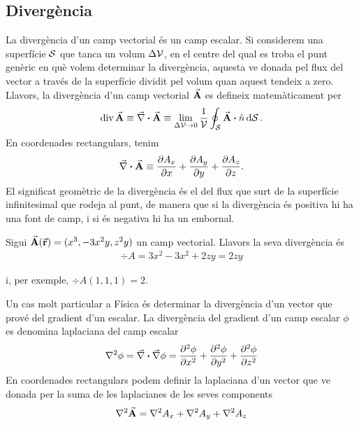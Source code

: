 \subsection{Divergència}
La divergència d'un camp vectorial és un camp escalar. Si considerem una superfície $\mathcal{S}$ que tanca un volum $\Delta \mathcal{V}$, en el centre del qual es troba el punt genèric en què volem determinar la divergència, aquesta ve donada pel flux del vector a través de la superfície dividit pel volum quan aquest tendeix a zero. Llavors, la divergència d'un camp vectorial $\va{A}$ es defineix matemàticament per
\begin{align}
	\operatorname{div} \va{A} \equiv \div{A} \equiv \lim_{\Delta \mc{V} \to 0} \frac{1}{\mc{V}} \oint_{\mc{S}} \va{A} \vdot \hat{n} \dd{\mc{S}}.
\end{align}
En coordenades rectangulars, tenim
\begin{align}
	\div{A} \equiv \pdv{A_{x}}{x} + \pdv{A_{y}}{y} + \pdv{A_{z}}{z}.
\end{align}
El significat geomètric de la divergència és el del flux que surt de la superfície infinitesimal que rodeja al punt, de manera que si la divergència és positiva hi ha una font de camp, i si és negativa hi ha un embornal.
\begin{example}
	Sigui $\va{A} (\va{r}) = (x^{3}, - 3x^{2}y, z^{2}y)$ un camp vectorial. Llavors la seva divergència és
	\begin{align*}
		\div{A} = 3x^{2} - 3x^{2} + 2zy = 2zy
	\end{align*}

	i, per exemple, $\div{A} (1,1,1) = 2$.
\end{example}

\begin{defi}[Laplaciana]
	Un cas molt particular a Física és determinar la divergència d'un vector que prové del gradient d'un escalar. La divergència del gradient d'un camp escalar $\phi$ es denomina laplaciana del camp escalar
	\begin{align}
		\laplacian{\phi} = \vnabla \vdot \grad{\phi} = \pdv[2]{\phi}{x} + \pdv[2]{\phi}{y} + \pdv[2]{\phi}{z}
	\end{align}
	En coordenades rectangulars podem definir la laplaciana d'un vector que ve donada per la suma de les laplacianes de les seves components
	\begin{align}
		\laplacian{\va{A}} = \laplacian{A_{x}} + \laplacian{A_{y}} + \laplacian{A_{z}}
	\end{align}
\end{defi}

